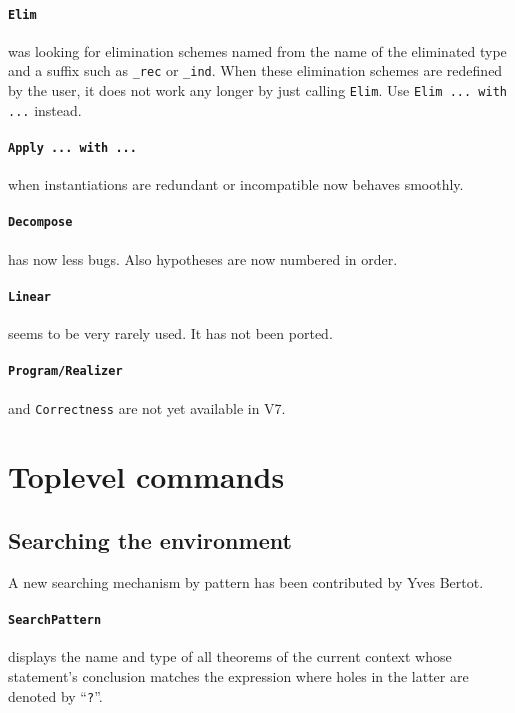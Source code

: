 \documentclass[11pt]{article}
\begin{document}
  \paragraph{{\tt Elim}} was looking for elimination schemes named
  from the name of the eliminated type and a suffix such as
  \verb:_rec: or \verb:_ind:. When these elimination schemes are
  redefined by the user, it does not work any longer by just calling
  {\tt Elim}. Use {\tt Elim ... with ...} instead.

  \paragraph{{\tt Apply ... with ...}} when instantiations are
  redundant or incompatible now behaves smoothly.

  \paragraph{{\tt Decompose}} has now less bugs. Also hypotheses
  are now numbered in order.

  \paragraph{{\tt Linear}} seems to be very rarely used. It has not
  been ported.

  \paragraph{{\tt Program/Realizer}} and {\tt Correctness} are not yet
  available in {\Coq} V7.

\section{Toplevel commands}

\subsection{Searching the environment}
\label{Search}
A new searching mechanism by pattern has been contributed by Yves Bertot.


\paragraph{{\tt SearchPattern {\term}}}
displays the name and type of all theorems of the current
context whose statement's conclusion matches the expression {\term}
where holes in the latter are denoted by ``{\tt ?}''.
\end{document}
